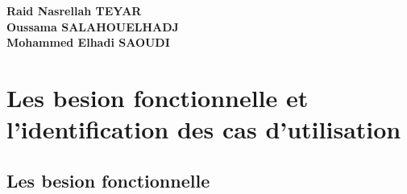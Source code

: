 \documentclass[a4paper,12p]{article}
\begin{document}


    \begin{center}
        \textbf{Raid Nasrellah TEYAR} \\
        \textbf{Oussama SALAHOUELHADJ} \\
        \textbf{Mohammed Elhadi SAOUDI} \\
    \end{center}

    \raggedright\section{Les besion fonctionnelle et l'identification des cas d'utilisation}


    \subsection{Les besion fonctionnelle}
\end{document}
